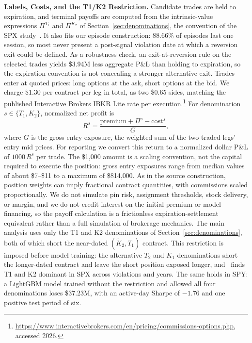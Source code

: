 \documentclass[sigconf,review]{acmart}
\begin{document}
\smallskip\noindent\textbf{Labels, Costs, and the T1/K2 Restriction.}
\label{sec:labels}
Candidate trades are held to expiration, and terminal payoffs are computed from the intrinsic-value expressions $\Pi^{T_1}$ and $\Pi^{K_2}$ of Section~\ref{sec:denominations}, the convention of the SPX study~\cite{glasserman2025tp2}. It also fits our episode construction: 88.66\% of episodes last one session, so most never present a post-signal violation date at which a reversion exit could be defined. As a robustness check, an exit-at-reversion rule on the selected trades yields \$3.94M less aggregate P\&L than holding to expiration, so the expiration convention is not concealing a stronger alternative exit.
Trades enter at quoted prices: long options at the ask, short options at the bid. We charge \$1.30 per contract per leg in total, as two \$0.65 sides, matching the published Interactive Brokers IBKR Lite rate per execution.\footnote{\url{https://www.interactivebrokers.com/en/pricing/commissions-options.php}, accessed 2026.} For denomination $s\in\{T_1,K_2\}$, normalized net profit is
\[
R^{s}=
\frac{\mathrm{premium}+\Pi^{s}-\mathrm{cost}^{s}}{G},
\]
where $G$ is the gross entry exposure, the weighted sum of the two traded legs' entry mid prices.
For reporting we convert this return to a normalized dollar P\&L of $1000\,R^{s}$ per trade. The \$1{,}000 amount is a scaling convention, not the capital required to execute the position: gross entry exposures range from median values of about \$7--\$11 to a maximum of \$814{,}000. As in the source construction, position weights can imply fractional contract quantities, with commissions scaled proportionally. We do not simulate pin risk, assignment thresholds, stock delivery, or margin, and we do not credit interest on the initial premium or model financing, so the payoff calculation is a frictionless expiration-settlement equivalent rather than a full simulation of brokerage mechanics.
The main analysis uses only the T1 and K2 denominations of Section~\ref{sec:denominations}, both of which short the near-dated $(\tilde K_2,T_1)$ contract. This restriction is imposed before model training: the alternative $T_2$ and $K_1$ denominations short the longer-dated contract and leave the short position exposed longer, and~\cite{glasserman2025tp2} finds T1 and K2 dominant in SPX across violations and years. The same holds in SPY: a LightGBM model trained without the restriction and allowed all four denominations loses \$37.23M, with an active-day Sharpe of $-1.76$ and one positive test period of six.
\end{document}
